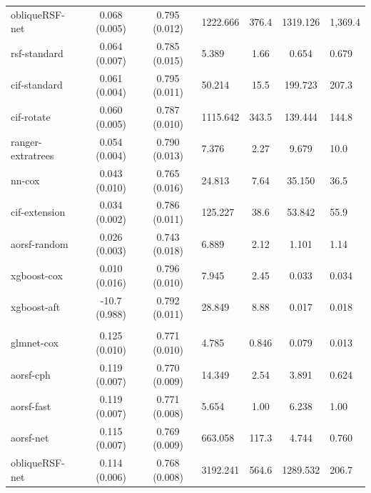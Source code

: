 \documentclass[twoside,11pt]{article}\usepackage[]{graphicx}\usepackage[]{xcolor}
\newenvironment{knitrout}{}{} %
\begin{document}
\begin{knitrout}
\begin{longtable}{lcclccl}
\hspace{1em}obliqueRSF-net & 0.068 (0.005) & 0.795 (0.012) & 1222.666 & 376.4 & 1319.126 & 1,369.4\\
\hspace{1em}rsf-standard & 0.064 (0.007) & 0.785 (0.015) & 5.389 & 1.66 & 0.654 & 0.679\\
\hspace{1em}cif-standard & 0.061 (0.004) & 0.795 (0.011) & 50.214 & 15.5 & 199.723 & 207.3\\
\hspace{1em}cif-rotate & 0.060 (0.005) & 0.787 (0.010) & 1115.642 & 343.5 & 139.444 & 144.8\\
\hspace{1em}ranger-extratrees & 0.054 (0.004) & 0.790 (0.013) & 7.376 & 2.27 & 9.679 & 10.0\\
\hspace{1em}nn-cox & 0.043 (0.010) & 0.765 (0.016) & 24.813 & 7.64 & 35.150 & 36.5\\
\hspace{1em}cif-extension & 0.034 (0.002) & 0.786 (0.011) & 125.227 & 38.6 & 53.842 & 55.9\\
\hspace{1em}aorsf-random & 0.026 (0.003) & 0.743 (0.018) & 6.889 & 2.12 & 1.101 & 1.14\\
\hspace{1em}xgboost-cox & 0.010 (0.016) & 0.796 (0.010) & 7.945 & 2.45 & 0.033 & 0.034\\
\hspace{1em}xgboost-aft & -10.7 (0.988) & 0.792 (0.011) & 28.849 & 8.88 & 0.017 & 0.018\\
\addlinespace[0.3em]
\hline
\multicolumn{7}{l}{\textit{\textbf{SPRINT; death, n = 9361, p = 174}}}\\
\hline
\hspace{1em}glmnet-cox & 0.125 (0.010) & 0.771 (0.010) & 4.785 & 0.846 & 0.079 & 0.013\\
\hspace{1em}aorsf-cph & 0.119 (0.007) & 0.770 (0.009) & 14.349 & 2.54 & 3.891 & 0.624\\
\hspace{1em}aorsf-fast & 0.119 (0.007) & 0.771 (0.008) & 5.654 & 1.00 & 6.238 & 1.00\\
\hspace{1em}aorsf-net & 0.115 (0.007) & 0.769 (0.009) & 663.058 & 117.3 & 4.744 & 0.760\\
\hspace{1em}obliqueRSF-net & 0.114 (0.006) & 0.768 (0.008) & 3192.241 & 564.6 & 1289.532 & 206.7\\

\end{longtable}
\end{knitrout}
\end{document}
